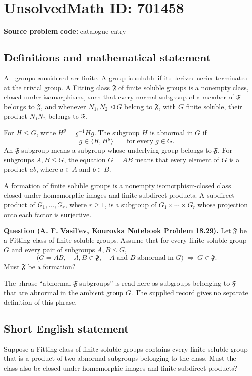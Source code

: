 \documentclass[11pt]{article}
\begin{document}
\section*{UnsolvedMath ID: 701458}
\textbf{Source problem code:} catalogue entry
\subsection{Definitions and mathematical statement}
All groups considered are finite. A group is soluble if its derived series terminates at the trivial group. A Fitting class \(\mathfrak F\) of finite soluble groups is a nonempty class, closed under isomorphisms, such that every normal subgroup of a member of \(\mathfrak F\) belongs to \(\mathfrak F\), and whenever \(N_1,N_2\trianglelefteq G\) belong to \(\mathfrak F\), with \(G\) finite soluble, their product \(N_1N_2\) belongs to \(\mathfrak F\).

For \(H\leq G\), write \(H^g=g^{-1}Hg\). The subgroup \(H\) is abnormal in \(G\) if
\[
 g\in\langle H,H^g\rangle\qquad\text{for every }g\in G.
\]
An \(\mathfrak F\)-subgroup means a subgroup whose underlying group belongs to \(\mathfrak F\). For subgroups \(A,B\leq G\), the equation \(G=AB\) means that every element of \(G\) is a product \(ab\), where \(a\in A\) and \(b\in B\).

A formation of finite soluble groups is a nonempty isomorphism-closed class closed under homomorphic images and finite subdirect products. A subdirect product of \(G_1,\ldots,G_r\), where \(r\geq1\), is a subgroup of \(G_1\times\cdots\times G_r\) whose projection onto each factor is surjective.

\textbf{Question (A. F. Vasil'ev, Kourovka Notebook Problem 18.29).} Let \(\mathfrak F\) be a Fitting class of finite soluble groups. Assume that for every finite soluble group \(G\) and every pair of subgroups \(A,B\leq G\),
\[
\bigl(G=AB,\quad A,B\in\mathfrak F,\quad A\text{ and }B\text{ abnormal in }G\bigr)
\ \Longrightarrow\ G\in\mathfrak F.
\]
Must \(\mathfrak F\) be a formation?

The phrase ``abnormal \(\mathfrak F\)-subgroups'' is read here as subgroups belonging to \(\mathfrak F\) that are abnormal in the ambient group \(G\). The supplied record gives no separate definition of this phrase.
\subsection{Short English statement}
Suppose a Fitting class of finite soluble groups contains every finite soluble group that is a product of two abnormal subgroups belonging to the class. Must the class also be closed under homomorphic images and finite subdirect products?
\end{document}
